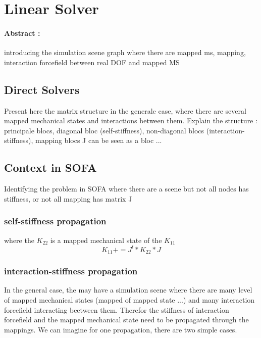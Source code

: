 \documentclass[a4paper,10pt]{article}
\begin{document}
\section{Linear Solver}
\paragraph{Abstract : }
introducing the simulation scene graph where there are mapped ms, mapping, interaction forcefield between real DOF and mapped MS

\subsection{Direct Solvers }
Present here the matrix structure in the generale case, where there are several mapped mechanical states and interactions between them. Explain the structure : principale blocs, diagonal bloc (self-stiffness), non-diagonal blocs (interaction-stiffness), mapping blocs J can be seen as a bloc ...
\subsection{Context in SOFA }
Identifying the problem in SOFA where there are a scene but not all nodes has stiffness, or not all mapping has matrix J
\subsubsection{self-stiffness propagation }
where the $K_{22}$ is a mapped mechanical state of the $K_{11}$
\[
 K_{11} += J^t * K_{22} * J
\]
\subsubsection{interaction-stiffness propagation }
In the general case, the may have a simulation scene where there are many level of mapped mechanical states (mapped of mapped state ...) and many interaction forcefield interacting beetween them. Therefor the stiffness of interaction forcefield and the mapped mechanical state need to be propagated through the mappings. We can imagine for one propagation, there are two simple cases.
\end{document}
